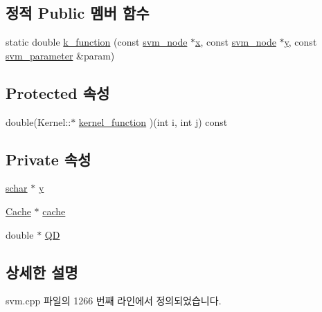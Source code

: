 \subsection*{정적 Public 멤버 함수}
\begin{DoxyCompactItemize}
\item 
static double \hyperlink{class_kernel_a6ff0d4ac64bf7fba29d2ca3433dd5127}{k\+\_\+function} (const \hyperlink{structsvm__node}{svm\+\_\+node} $\ast$\hyperlink{class_kernel_a725a35660c4309605c2628fa8290ce5f}{x}, const \hyperlink{structsvm__node}{svm\+\_\+node} $\ast$\hyperlink{class_s_v_c___q_a6a37679890a665d32286a3ab047fc0f4}{y}, const \hyperlink{structsvm__parameter}{svm\+\_\+parameter} \&param)
\end{DoxyCompactItemize}
\subsection*{Protected 속성}
\begin{DoxyCompactItemize}
\item 
double(Kernel\+::$\ast$ \hyperlink{class_kernel_a575eeb588e8a5c62ff3228a35e255a02}{kernel\+\_\+function} )(int i, int j) const 
\end{DoxyCompactItemize}
\subsection*{Private 속성}
\begin{DoxyCompactItemize}
\item 
\hyperlink{svm_8cpp_a0fd9ce9d735064461bebfe6037026093}{schar} $\ast$ \hyperlink{class_s_v_c___q_a6a37679890a665d32286a3ab047fc0f4}{y}
\item 
\hyperlink{class_cache}{Cache} $\ast$ \hyperlink{class_s_v_c___q_a70e4787695cadf49495accdd36fb140f}{cache}
\item 
double $\ast$ \hyperlink{class_s_v_c___q_a635d129ea1d840296db2e8e1d4ada404}{Q\+D}
\end{DoxyCompactItemize}


\subsection{상세한 설명}


svm.\+cpp 파일의 1266 번째 라인에서 정의되었습니다.



